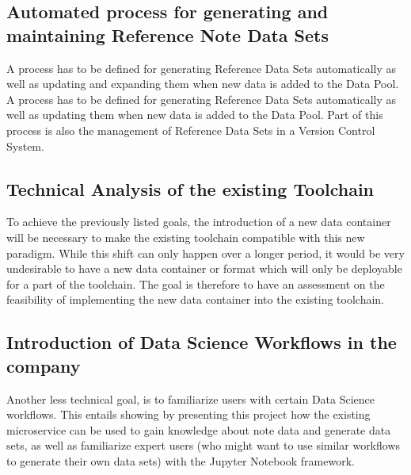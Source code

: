 \subsection{Automated process for generating and maintaining Reference Note Data Sets}

A process has to be defined for generating Reference Data Sets automatically as well as updating and expanding them when new data is added to the Data Pool. A process has to be defined for generating Reference Data Sets automatically as well as updating them when new data is added to the Data Pool. Part of this process is also the management of Reference Data Sets in a Version Control System. 

\subsection{Technical Analysis of the existing Toolchain}

To achieve the previously listed goals, the introduction of a new data container will be necessary to make the existing toolchain compatible with this new paradigm. While this shift can only happen over a longer period, it would be very undesirable to have a new data container or format which will only be deployable for a part of the toolchain. The goal is therefore to have an assessment on the feasibility of implementing the new data container into the existing toolchain. 


\subsection{Introduction of Data Science Workflows in the company}
Another less technical goal, is to familiarize users with certain Data Science workflows. This entails showing by presenting this project how the existing microservice can be used to gain knowledge about note data and generate data sets, as well as familiarize expert users (who might want to use similar workflows to generate their own data sets) with the Jupyter Notebook framework.